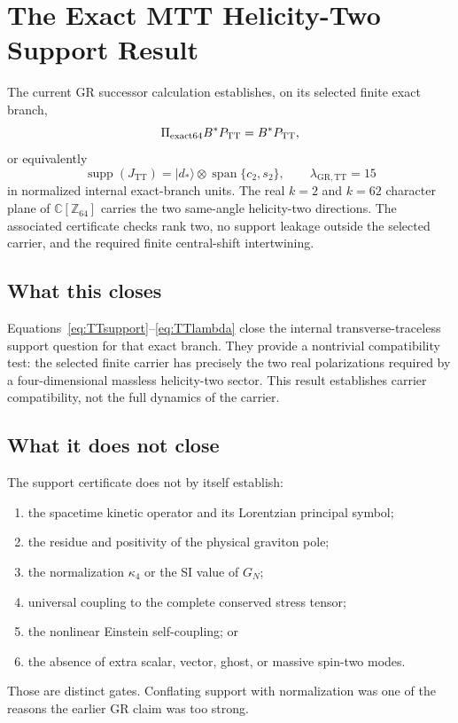\documentclass[11pt,a4paper]{article}
\theoremstyle{definition}
\theoremstyle{remark}
\newcommand{\TT}{\mathrm{TT}}
\begin{document}
\section{The Exact MTT Helicity-Two Support Result}

The current GR successor calculation establishes, on its selected finite
exact branch,
\begin{equation}
 \Pi_{\rm exact64}B^\ast P_{\TT}=B^\ast P_{\TT},
\label{eq:TTsupport}
\end{equation}
or equivalently
\begin{equation}
 \operatorname{supp}(J_{\TT})
 =|d_\ast\rangle\otimes
 \operatorname{span}\{c_2,s_2\},
\qquad
 \lambda_{\mathrm{GR},\TT}=15
\label{eq:TTlambda}
\end{equation}
in normalized internal exact-branch units.  The real
\(k=2\) and \(k=62\) character plane of \(\mathbb C[\mathbb Z_{64}]\) carries
the two same-angle helicity-two directions.  The associated certificate
checks rank two, no support leakage outside the selected carrier, and the
required finite central-shift intertwining.

\subsection{What this closes}

Equations~\eqref{eq:TTsupport}--\eqref{eq:TTlambda} close the internal
transverse-traceless support question for that exact branch.  They provide a
nontrivial compatibility test: the selected finite carrier has precisely the
two real polarizations required by a four-dimensional massless helicity-two
sector.
This result establishes carrier compatibility, not the full dynamics of the
carrier.

\subsection{What it does not close}

The support certificate does not by itself establish:
\begin{enumerate}
\item the spacetime kinetic operator and its Lorentzian principal symbol;
\item the residue and positivity of the physical graviton pole;
\item the normalization \(\kappa_4\) or the SI value of \(G_N\);
\item universal coupling to the complete conserved stress tensor;
\item the nonlinear Einstein self-coupling; or
\item the absence of extra scalar, vector, ghost, or massive spin-two modes.
\end{enumerate}
Those are distinct gates.  Conflating support with normalization was one of
the reasons the earlier GR claim was too strong.
\end{document}
